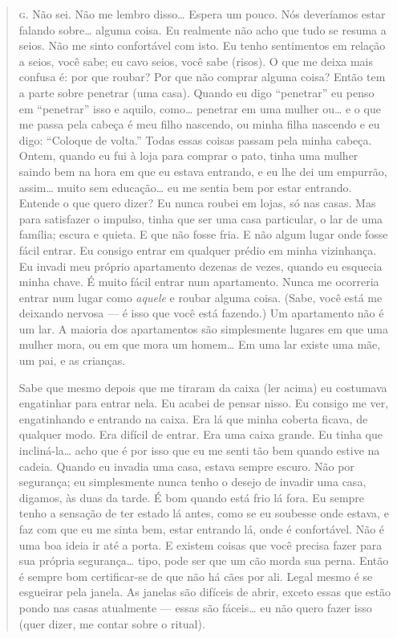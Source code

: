 \begin{quote}
\noindent\hskip0mm\textsc{g.} Não sei. Não me lembro disso\ldots{} Espera um pouco. Nós deveríamos estar
falando sobre\ldots{} alguma coisa. Eu realmente não acho que tudo se
resuma a seios.\idxseios{} Não me sinto confortável com isto. Eu tenho sentimentos
em relação a seios, você sabe; eu cavo seios, você sabe (risos). O que
me deixa mais confusa é: por que roubar? Por que não comprar alguma
coisa? Então tem a parte sobre penetrar (uma casa). Quando eu digo
``penetrar'' eu penso em
``penetrar'' isso e aquilo, como\ldots{} penetrar
em uma mulher ou\ldots{} e o que me passa pela cabeça é meu filho nascendo,
ou minha filha nascendo e eu digo: ``Coloque de
volta.'' Todas essas coisas passam pela minha cabeça.
Ontem, quando eu fui à loja para comprar o pato, tinha uma mulher
saindo bem na hora em que eu estava entrando, e eu lhe dei um empurrão,
assim\ldots{} muito sem educação\ldots{} eu me sentia bem por estar entrando.
Entende o que quero dizer? Eu nunca roubei em lojas, só nas casas. Mas
para satisfazer o impulso, tinha que ser uma casa particular, o lar de
uma família; escura e quieta. E que não fosse fria. E não algum lugar
onde fosse fácil entrar. Eu consigo entrar em qualquer prédio em minha
vizinhança. Eu invadi meu próprio apartamento dezenas de vezes, quando
eu esquecia minha chave. É muito fácil entrar num apartamento. Nunca me
ocorreria entrar num lugar como \textit{aquele} e roubar alguma coisa.
(Sabe, você está me deixando nervosa --- é isso que você está
fazendo.) Um apartamento não é um lar. A maioria dos apartamentos são
simplesmente lugares em que uma mulher mora, ou em que mora um homem\ldots{}
Em uma lar existe uma mãe, um pai, e as crianças.

Sabe que mesmo depois que me tiraram da caixa (ler acima) eu
costumava engatinhar para entrar nela. Eu acabei de pensar nisso. Eu
consigo me ver, engatinhando e entrando na caixa. Era lá que minha
coberta ficava, de qualquer modo. Era difícil de entrar. Era uma caixa
grande. Eu tinha que incliná-la\ldots{} acho que é por isso que eu me senti
tão bem quando estive na cadeia. Quando eu invadia uma casa, estava
sempre escuro. Não por segurança; eu simplesmente nunca tenho o desejo
de invadir uma casa, digamos, às duas da tarde. É bom quando está frio
lá fora. Eu sempre tenho a sensação de ter estado lá antes, como se eu
soubesse onde estava, e faz com que eu me sinta bem, estar entrando lá,
onde é confortável. Não é uma boa ideia ir até a porta. E existem
coisas que você precisa fazer para sua própria segurança\ldots{} tipo, pode
ser que um cão morda sua perna. Então é sempre bom certificar-se de que
não há cães por ali. Legal mesmo é se esgueirar pela janela. As janelas
são difíceis de abrir, exceto essas que estão pondo nas casas
atualmente --- essas são fáceis\ldots{} eu não quero fazer isso (quer
dizer, me contar sobre o ritual).


\end{quote}
